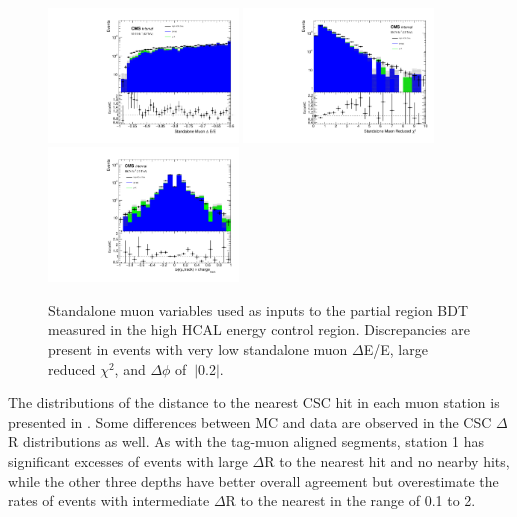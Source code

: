 \begin{figure}[htbp]
	\centering
	\includegraphics[width=0.45\textwidth]{figures/standaloneMuonValidation.pdf}
	\hspace{0.01\textwidth}
	\includegraphics[width=0.45\textwidth]{figures/standaloneMuonChiValidation.pdf}
	\vspace{0.01\textwidth}
	\includegraphics[width=0.45\textwidth]{figures/standaloneMuonPhiValidation.pdf}
        \caption[Standalone Muon Validation]{Standalone muon variables used as inputs to the partial region BDT measured in the high HCAL energy control region. Discrepancies are present in events with very low standalone muon $\Delta$E/E, large reduced $\chi^{2}$, and $\Delta\phi$ of $~|$0.2$|$.}
        \label{fig:BDTstavalid}
\end{figure}

The distributions of the distance to the nearest CSC hit in each muon station is presented in . 
Some differences between MC and data are observed in the CSC $\Delta$R distributions as well. 
As with the tag-muon aligned segments, station 1 has significant excesses of events with large $\Delta$R to the nearest hit and no nearby hits, while the other three depths have better overall agreement but overestimate the rates of events with intermediate $\Delta$R to the nearest in the range of 0.1 to 2.

